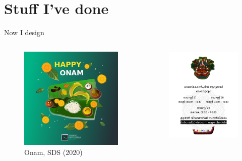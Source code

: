 \documentclass[presentation]{beamer}
\begin{document}
\section*{Stuff I've done}
\label{sec:org7df3c4e}
\begin{frame}[label={sec:orgaf4c7a7}]{Now I design}
\begin{columns}
\begin{column}{0.25\columnwidth}
\begin{figure}[htbp]
\centering
\includegraphics[width=.9\linewidth]{././onam4.png}
\caption{Onam, SDS (2020)}
\end{figure}
\end{column}
\begin{column}{0.25\columnwidth}
\begin{figure}[htbp]
\centering
\includegraphics[width=.9\linewidth]{././theyyam.png}

\end{figure}
\end{column}
\end{columns}
\end{frame}
\end{document}
